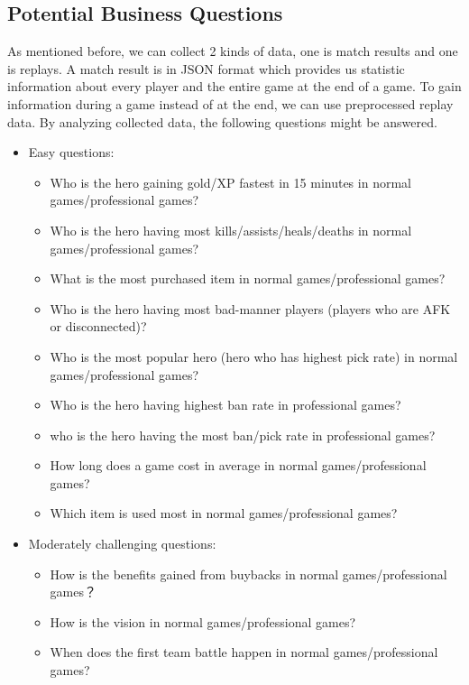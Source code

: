 \documentclass{article}
\begin{document}

\subsection{Potential Business Questions}

As mentioned before, we can collect 2 kinds of data, one is match results and one is replays. A match result is in JSON format which provides us statistic information about every player and the entire game at the end of a game. To gain information during a game instead of at the end, we can use preprocessed replay data. By analyzing collected data, the following questions might be answered.
\begin{itemize}
    \item Easy questions:
    \begin{itemize}
        \item Who is the hero gaining gold/XP fastest in 15 minutes in normal games/professional games?
        \item Who is the hero having most kills/assists/heals/deaths in normal games/professional games?
        \item What is the most purchased item in normal games/professional games?
        \item Who is the hero having most bad-manner players (players who are AFK or disconnected)?
        \item Who is the most popular hero (hero who has highest pick rate) in normal games/professional games?
        \item Who is the hero having highest ban rate in professional games?
        \item who is the hero having the most ban/pick rate in professional games?
        \item How long does a game cost in average in normal games/professional games?
        \item Which item is used most in normal games/professional games?
    \end{itemize}
    \item Moderately challenging questions:
    \begin{itemize}
        \item How is the benefits gained from buybacks in normal games/professional games？
        \item How is the vision in normal games/professional games?
        \item When does the first team battle happen in normal games/professional games?

\end{itemize}
\end{itemize}
\end{document}
